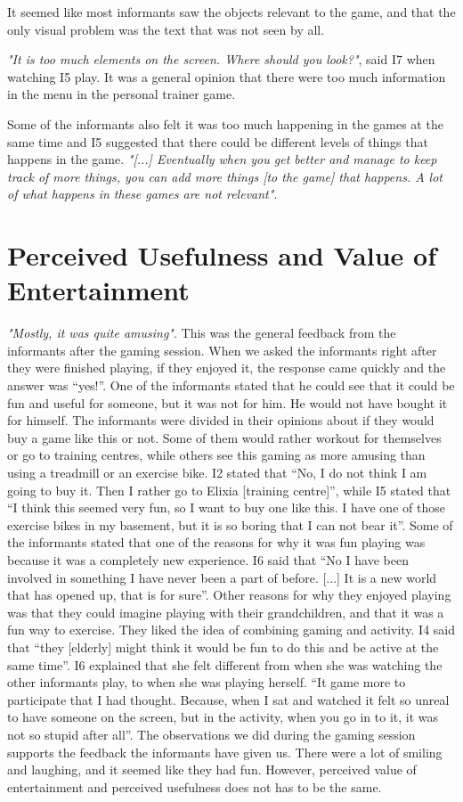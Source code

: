 It seemed like most informants saw the objects relevant to the game, and that the only visual problem was the text that was not seen by all.

\emph{"It is too much elements on the screen. Where should you look?"}, said I7 when watching I5 play. It was a general opinion that there were too much information in the menu in the personal trainer game. 

Some of the informants also felt it was too much happening in the games at the same time and I5 suggested that there could be different levels of things that happens in the game. \emph{"[...] Eventually when you get better and manage to keep track of more things, you can add more things [to the game] that happens. A lot of what happens in these games are not relevant"}.

\section{Perceived Usefulness and Value of Entertainment}
\emph{"Mostly, it was quite amusing"}. This was the general feedback from the informants after the gaming session. When we asked the informants right after they were finished playing, if they enjoyed it, the response came quickly and the answer was “yes!”. One of the informants stated that he could see that it could be fun and useful for someone, but it was not for him. He would not have bought it for himself. The informants were divided in their opinions about if they would buy a game like this or not. Some of them would rather workout for themselves or go to training centres, while others see this gaming as more amusing than using a treadmill or an exercise bike. I2 stated that “No, I do not think I am going to buy it. Then I rather go to Elixia [training centre]”, while I5 stated that “I think this seemed very fun, so I want to buy one like this. I have one of those exercise bikes in my basement, but it is so boring that I can not bear it”.  Some of the informants stated that one of the reasons for why it was fun playing was because it was a completely new experience. I6 said that “No I have been involved in something I have never been a part of before. [...] It is a new world that has opened up, that is for sure”. Other reasons for why they enjoyed playing was that they could imagine playing with their grandchildren, and that it was a fun way to exercise. They liked the idea of combining gaming and activity. I4 said that “they [elderly] might think it would be fun to do this and be active at the same time”. I6 explained that she felt different from when she was watching the other informants play, to when she was playing herself. “It game more to participate that I had thought. Because, when I sat and watched it felt so unreal to have someone on the screen, but in the activity, when you go in to it, it was not so stupid after all”. The observations we did during the gaming session supports the feedback the informants have given us. There were a lot of smiling and laughing, and it seemed like they had fun. However, perceived value of entertainment and perceived usefulness does not has to be the same. 

